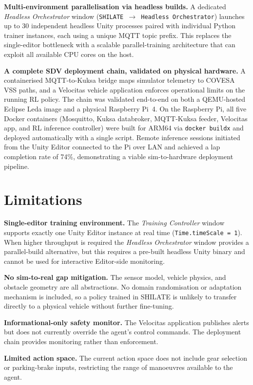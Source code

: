 \textbf{Multi-environment parallelisation via headless builds.} A
dedicated \textit{Headless Orchestrator} window (\texttt{SHILATE
$\to$ Headless Orchestrator}) launches up to 30 independent headless
Unity processes paired with individual Python trainer instances, each
using a unique MQTT topic prefix. This replaces the single-editor
bottleneck with a scalable parallel-training architecture that can
exploit all available CPU cores on the host.

\textbf{A complete SDV deployment chain, validated on physical hardware.}
A containerised MQTT-to-Kuksa bridge maps simulator telemetry to COVESA
VSS paths, and a Velocitas vehicle application enforces operational limits
on the running RL policy. The chain was validated end-to-end on both a
QEMU-hosted Eclipse Leda image and a physical Raspberry Pi~4. On the
Raspberry Pi, all five Docker containers (Mosquitto, Kuksa databroker,
MQTT-Kuksa feeder, Velocitas app, and RL inference controller) were built
for ARM64 via \texttt{docker buildx} and deployed automatically with a
single script. Remote inference sessions initiated from the Unity Editor
connected to the Pi over LAN and achieved a lap completion rate of 74\%,
demonstrating a viable sim-to-hardware deployment pipeline.

\section{Limitations}
\label{sec:limitations}

\textbf{Single-editor training environment.} The \textit{Training
Controller} window supports exactly one Unity Editor instance at real
time (\texttt{Time.timeScale = 1}). When higher throughput is required
the \textit{Headless Orchestrator} window provides a parallel-build
alternative, but this requires a pre-built headless Unity binary and
cannot be used for interactive Editor-side monitoring.

\textbf{No sim-to-real gap mitigation.} The sensor model, vehicle
physics, and obstacle geometry are all abstractions. No domain
randomisation or adaptation mechanism is included, so a policy trained
in SHILATE is unlikely to transfer directly to a physical vehicle
without further fine-tuning.

\textbf{Informational-only safety monitor.} The Velocitas application
publishes alerts but does not currently override the agent's control
commands. The deployment chain provides monitoring rather than
enforcement.

\textbf{Limited action space.} The current action space does not include
gear selection or parking-brake inputs, restricting the range of
manoeuvres available to the agent.

